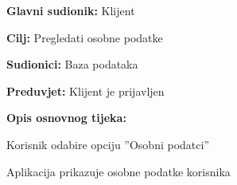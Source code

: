                         \noindent {}
					\begin{packed_item}
	
						\item \textbf{Glavni sudionik: }Klijent
						\item  \textbf{Cilj:} Pregledati osobne podatke
						\item  \textbf{Sudionici:} Baza podataka
						\item  \textbf{Preduvjet:} Klijent je prijavljen
						\item  \textbf{Opis osnovnog tijeka:}
						
						\item[] \begin{packed_enum}
	
							\item Korisnik odabire opciju ”Osobni podatci”
							\item Aplikacija prikazuje osobne podatke korisnika
							
							
						\end{packed_enum}

                    
					\end{packed_item}


